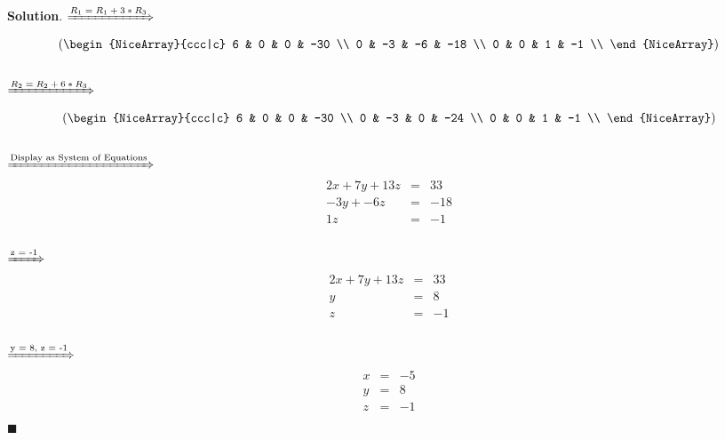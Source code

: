 \documentclass[12pt]{article}
\renewcommand{\=}[1]{\stackrel{#1}{=}} %
\theoremstyle{definition}
\newenvironment{s}{%
        \begin{trivlist} \item \textbf{Solution}. }{%
            \hspace*{\fill} $\blacksquare$\end{trivlist}}%
\begin{document}
\begin{s}
  $\xRightarrow{\text{$R_1 = R_1 + 3 * R_3$}}$
  \\
     
  \[
    \left(\begin{NiceArray}{ccc|c}
      6 & 0  & 0  & -30 \\
      0 & -3 & -6 & -18 \\
      0 & 0  & 1  & -1  \\
    \end{NiceArray} \right)
  \]
  \\

  $\xRightarrow{\text{$R_2 = R_2 + 6 * R_3$}}$
  \\
     
  \[
    \left(\begin{NiceArray}{ccc|c}
      6 & 0  & 0  & -30 \\
      0 & -3 & 0 & -24 \\
      0 & 0  & 1  & -1  \\
    \end{NiceArray} \right)
  \]
  \\
  $\xRightarrow{\text{Display as System of Equations}}$
  \\
  \[
    \begin{array}{lcl} 
    2x +7y + 13z & = & 33 \\ 
    -3y + -6z & = & -18 \\ 
    1z & = & -1 \\
    \end{array}
  \]
  \\
  $\xRightarrow{\text{z = -1}}$
  \\
  \[
    \begin{array}{lcl} 
    2x +7y + 13z & = & 33 \\ 
    y & = & 8 \\ 
    z & = & -1 \\
    \end{array}
  \]
  \\
  $\xRightarrow{\text{y = 8, z = -1}}$
  \\
  \[
    \begin{array}{lcl} 
    x & = & -5 \\ 
    y & = & 8 \\ 
    z & = & -1 \\
    \end{array}
  \]
\end{s}
\end{document}
